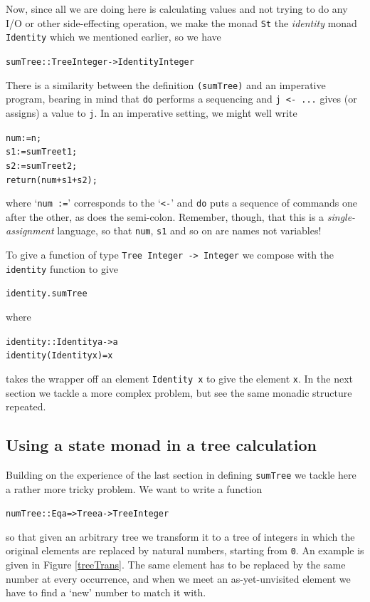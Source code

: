 Now, since all we are doing here is calculating values and not trying to do
any I/O or other side-effecting operation, we make the monad 
\texttt{St} the {\em identity\/} monad \texttt{Identity} which we mentioned
earlier, so we have
\begin{alltt}
sumTree :: Tree Integer -> Identity Integer
\end{alltt}
There is a similarity between the definition \texttt{(sumTree)} and an
imperative program, bearing in mind that \texttt{do} performs a sequencing and
\texttt{j <- ...} gives (or assigns) a value to \texttt{j}. In an imperative
setting, we might well write 
\begin{alltt}
num := n ;
s1  := sumTree t1 ;
s2  := sumTree t2 ;
return (num + s1 + s2) ;
\end{alltt}
where `\texttt{num :=}' corresponds to the `\texttt{<-}' and \texttt{do} puts a 
sequence of commands one after the other, as does the semi-colon. Remember, though, that this is a \emph{single-assignment} language, so that \texttt{num}, \texttt{s1} and so on are names not variables!

To give a function of type \texttt{Tree Integer -> Integer} we compose with the
\texttt{identity} function to give
\begin{alltt}
identity . sumTree
\end{alltt}
where
\begin{alltt}
identity :: Identity a -> a
identity (Identity x) = x
\end{alltt}
takes the wrapper off an element \texttt{Identity x} to give the element
\texttt{x}.
In the next section we tackle a more complex problem, but see the same monadic
structure repeated.

\subsection*{Using a state monad in a tree calculation}

Building on the experience of the last section in defining \texttt{sumTree} we
tackle here a rather more tricky problem. We want to write a function
\begin{alltt}
numTree :: Eq a => Tree a -> Tree Integer
\end{alltt}
so that given an arbitrary tree we transform it to a tree of integers in which
the original elements are replaced by natural numbers, starting from \texttt{0}.
An example is given in Figure \ref{treeTrans}.
The same element has to be replaced by the same number at every occurrence,
and when we meet an as-yet-unvisited element we have to find a `new' number to
match it with.

